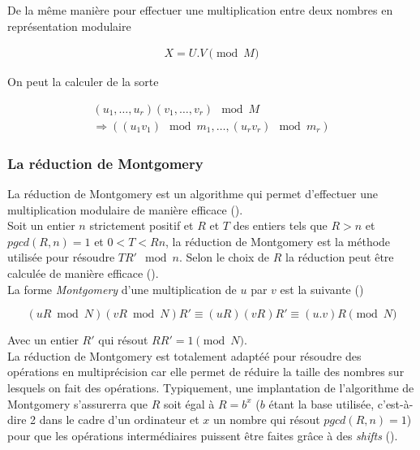 \documentclass[letterpaper]{article}
\begin{document}
De la même manière pour effectuer une multiplication entre deux nombres en
représentation modulaire

\begin{equation}
  \begin{split}
    X = U.V \pmod M
  \end{split}
\end{equation}

On peut la calculer de la sorte

\begin{equation}
  \begin{split}
    (u_1, \dots, u_r)  (v_1, \dots, v_r) \mod M \\
      \Rightarrow ((u_1 v_1) \mod m_1, \dots, (u_r v_r) \mod m_r)
  \end{split}
\end{equation}

\subsubsection{La réduction de Montgomery}

La réduction de Montgomery est un algorithme qui permet d'effectuer une
multiplication modulaire de manière efficace (\cite{menezes1996crypto}).\\

Soit un entier $n$ strictement positif et $R$ et $T$ des entiers tels que $R >
n$ et $pgcd(R, n) = 1$ et $0 < T < Rn$, la réduction de Montgomery est la
méthode utilisée pour résoudre $T R' \mod n$. Selon le choix de $R$ la
réduction peut être calculée de manière efficace (\cite{menezes1996crypto}).\\

La forme \emph{Montgomery} d'une multiplication de $u$ par $v$ est la
suivante (\cite{wikimontgomery})

$$(uR \bmod N)(vR \bmod N) R' ≡ (uR)(vR) R' ≡ (u.v) R \pmod N$$

Avec un entier $R'$ qui résout $RR' = 1 \pmod N$.\\

La réduction de Montgomery est totalement adaptéé pour résoudre des opérations
en multiprécision car elle permet de réduire la taille des nombres sur lesquels
on fait des opérations. Typiquement, une implantation de l'algorithme de
Montgomery s'assurerra que $R$ soit égal à $R = b^{x}$ ($b$ étant la base
utilisée, c'est-à-dire 2 dans le cadre d'un ordinateur et $x$ un nombre qui
résout $pgcd(R, n) = 1$) pour que les opérations intermédiaires puissent être
faites grâce à des \emph{shifts} (\cite{djguan2003montgomery}).
\end{document}
